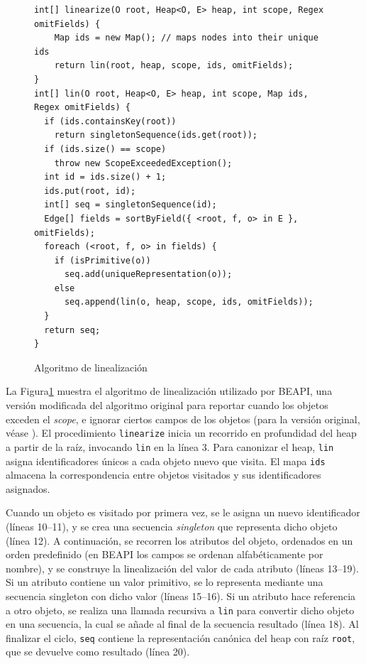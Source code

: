 \begin{figure}[!th]
\begin{lstlisting}
int[] linearize(O root, Heap<O, E> heap, int scope, Regex omitFields) {
    Map ids = new Map(); // maps nodes into their unique ids 
    return lin(root, heap, scope, ids, omitFields); 
}
int[] lin(O root, Heap<O, E> heap, int scope, Map ids, Regex omitFields) { 
  if (ids.containsKey(root))
    return singletonSequence(ids.get(root)); 
  if (ids.size() == scope) 
    throw new ScopeExceededException();
  int id = ids.size() + 1;
  ids.put(root, id);
  int[] seq = singletonSequence(id);
  Edge[] fields = sortByField({ <root, f, o> in E }, omitFields); 
  foreach (<root, f, o> in fields) {
    if (isPrimitive(o)) 
      seq.add(uniqueRepresentation(o));
    else
      seq.append(lin(o, heap, scope, ids, omitFields));
  }
  return seq; 
}
\end{lstlisting}
\caption{Algoritmo de linealización}
\label{alg:linearization}
\end{figure}


La Figura\ref{alg:linearization} muestra el algoritmo de linealización utilizado
por \textsf{BEAPI}, una versión modificada del algoritmo original para reportar
cuando los objetos exceden el \emph{scope}, e ignorar ciertos campos de los objetos (para la versión original, véase 
\cite{Xie04}). El procedimiento \texttt{linearize} inicia un recorrido en
profundidad del heap a partir de la raíz, invocando 
\texttt{lin} en la línea 3. Para canonizar el heap, \texttt{lin} asigna
identificadores únicos a cada objeto nuevo que visita. El mapa 
\texttt{ids} almacena la correspondencia entre objetos visitados y sus
identificadores asignados.

Cuando un objeto es visitado por primera vez, se le asigna un nuevo identificador (líneas 10--11), y se crea una secuencia \emph{singleton}
que representa dicho objeto (línea 12). A continuación, se recorren los
atributos del objeto, ordenados en un orden predefinido (en BEAPI los campos se
ordenan alfabéticamente por nombre), y se construye la linealización del valor
de cada atributo (líneas 13--19). Si un atributo contiene un valor primitivo, se lo representa mediante una secuencia singleton con dicho 
valor (líneas 15--16). Si un atributo hace referencia a otro objeto, se realiza una llamada recursiva a \texttt{lin} para convertir dicho objeto 
en una secuencia, la cual se añade al final de la secuencia resultado (línea
18). Al finalizar el ciclo, \texttt{seq} contiene la representación canónica del 
heap con raíz \texttt{root}, que se devuelve como resultado (línea 20).

